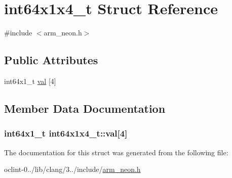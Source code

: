\hypertarget{structint64x1x4__t}{\section{int64x1x4\-\_\-t Struct Reference}
\label{structint64x1x4__t}
}


{\ttfamily \#include $<$arm\-\_\-neon.\-h$>$}

\subsection*{Public Attributes}
\begin{DoxyCompactItemize}
\item 
int64x1\-\_\-t \hyperlink{structint64x1x4__t_a93d034c9d503092ccc22486a7ad099ec}{val} \mbox{[}4\mbox{]}
\end{DoxyCompactItemize}


\subsection{Member Data Documentation}
\hypertarget{structint64x1x4__t_a93d034c9d503092ccc22486a7ad099ec}{
\subsubsection[{val}]{\setlength{\rightskip}{0pt plus 5cm}int64x1\-\_\-t int64x1x4\-\_\-t\-::val\mbox{[}4\mbox{]}}}\label{structint64x1x4__t_a93d034c9d503092ccc22486a7ad099ec}


The documentation for this struct was generated from the following file\-:\begin{DoxyCompactItemize}
\item 
oclint-\/0../lib/clang/3../include/\hyperlink{arm__neon_8h}{arm\-\_\-neon.\-h}\end{DoxyCompactItemize}
